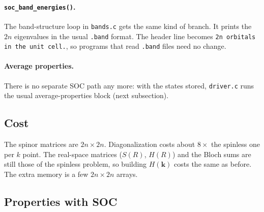 \documentclass[11pt,a4paper]{article}
\newcommand{\file}[1]{\texttt{#1}}
\newcommand{\fn}[1]{\texttt{#1()}}
\begin{document}
\paragraph{\fn{soc\_band\_energies}.} The band-structure loop in \file{bands.c} gets the
same kind of branch. It prints the $2n$ eigenvalues in the usual \texttt{.band} format.
The header line becomes \texttt{2n orbitals in the unit cell.}, so programs that read
\texttt{.band} files need no change.

\paragraph{Average properties.} There is no separate SOC path any more: with the states
stored, \file{driver.c} runs the usual average-properties block (next subsection).

\subsection{Cost}

The spinor matrices are $2n\times2n$. Diagonalization costs about $8\times$ the spinless
one per $k$ point. The real-space matrices ($S(R)$, $H(R)$) and the Bloch sums are still
those of the spinless problem, so building $H(\mathbf{k})$ costs the same as before. The
extra memory is a few $2n\times2n$ arrays.

\subsection{Properties with SOC}\label{sec:socprops}
\end{document}
